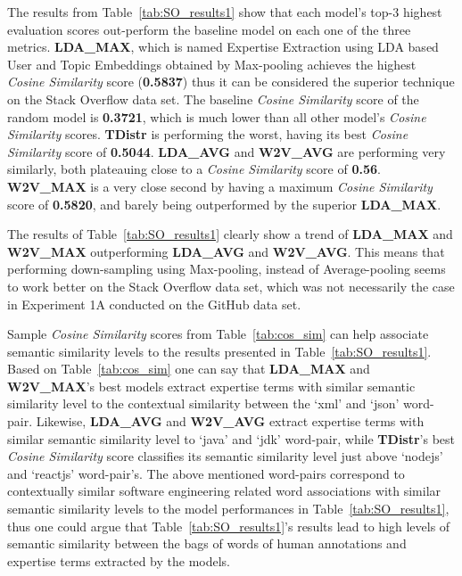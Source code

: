             The results from Table~\ref{tab:SO_results1} show that each model's top-$3$ highest evaluation scores out-perform the baseline model on each one of the three metrics. \textbf{LDA\_MAX}, which is named Expertise Extraction using LDA based User and Topic Embeddings obtained by Max-pooling achieves the highest \emph{Cosine Similarity} score (\textbf{0.5837}) thus it can be considered the superior technique on the Stack Overflow data set. The baseline \emph{Cosine Similarity} score of the random model is \textbf{0.3721}, which is much lower than all other model's \emph{Cosine Similarity} scores. \textbf{TDistr} is performing the worst, having its best \emph{Cosine Similarity} score of \textbf{0.5044}. \textbf{LDA\_AVG} and \textbf{W2V\_AVG} are performing very similarly, both plateauing close to a \emph{Cosine Similarity} score of \textbf{0.56}. \textbf{W2V\_MAX} is a very close second by having a maximum \emph{Cosine Similarity} score of \textbf{0.5820}, and barely being outperformed by the superior \textbf{LDA\_MAX}.
            
            The results of Table~\ref{tab:SO_results1} clearly show a trend of \textbf{LDA\_MAX} and \textbf{W2V\_MAX} outperforming \textbf{LDA\_AVG} and \textbf{W2V\_AVG}. This means that performing down-sampling using Max-pooling, instead of Average-pooling seems to work better on the Stack Overflow data set, which was not necessarily the case in Experiment 1A conducted on the GitHub data set.
            
            Sample \emph{Cosine Similarity} scores from Table~\ref{tab:cos_sim} can help associate semantic similarity levels to the results presented in Table~\ref{tab:SO_results1}. Based on Table~\ref{tab:cos_sim} one can say that  \textbf{LDA\_MAX} and \textbf{W2V\_MAX}'s best models extract expertise terms with similar semantic similarity level to the contextual similarity between the `xml' and `json' word-pair. Likewise, \textbf{LDA\_AVG} and \textbf{W2V\_AVG} extract expertise terms with similar semantic similarity level to `java' and `jdk' word-pair, while \textbf{TDistr}'s best \emph{Cosine Similarity} score classifies its semantic similarity level just above `nodejs' and `reactjs' word-pair's. The above mentioned word-pairs correspond to contextually similar software engineering related word associations with similar semantic similarity levels to the model performances in Table~\ref{tab:SO_results1}, thus one could argue that Table~\ref{tab:SO_results1}'s results lead to high levels of semantic similarity between the bags of words of human annotations and expertise terms extracted by the models.
            
